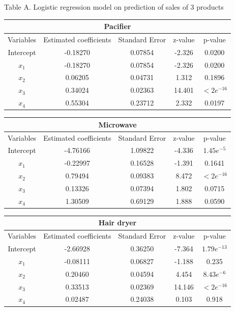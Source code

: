\documentclass[reqno]{article}
\theoremstyle{definition}
\theoremstyle{definition}
\theoremstyle{remark}
\begin{document}
\begin{center}
Table A. Logistic regression model on prediction of sales of 3 products
\begin{table}[]
    \centering
    \begin{tabular}{|c|c|c|c|c|}
    \hline
    \multicolumn{5}{|c|}{Pacifier}\\
    \hline
    Variables & Estimated coefficients &  Standard Error & z-value & p-value \\
    \hline
    Intercept  & -0.18270 &   0.07854  &-2.326 &  0.0200 \\
    $x_1$ & -0.18270 &   0.07854  &-2.326  & 0.0200   \\
    $x_2$ & 0.06205  &  0.04731  & 1.312  & 0.1896 \\
    $x_3$ & 0.34024 &   0.02363 & 14.401   & $<2e^{-16}$ \\
    $x_4$ & 0.55304  &  0.23712  & 2.332 & 0.0197 \\
    \hline
    \end{tabular}
    \begin{tabular}{|c|c|c|c|c|}
    \hline
    \multicolumn{5}{|c|}{Microwave}\\
    \hline
    Variables & Estimated coefficients &  Standard Error & z-value & p-value \\
    \hline
    Intercept  &  -4.76166  &  1.09822 & -4.336& $1.45e^{-5}$ \\
    $x_1$ & -0.22997   & 0.16528  &-1.391  & 0.1641\\
    $x_2$ & 0.79494  &  0.09383  & 8.472 & $<2e^{-16}$ \\
    $x_3$ &0.13326  &  0.07394  & 1.802  & 0.0715 \\
    $x_4$ &1.30509  &  0.69129 &  1.888 &  0.0590 \\
    \hline
    \end{tabular}
    \begin{tabular}{|c|c|c|c|c|}
    \hline
    \multicolumn{5}{|c|}{Hair dryer}\\
    \hline
    Variables & Estimated coefficients &  Standard Error & z-value & p-value \\
    \hline
    Intercept  & -2.66928 &   0.36250 & -7.364& $1.79e^{-13}$ \\
    $x_1$ & -0.08111 &   0.06827&  -1.188   & 0.235\\
    $x_2$ & 0.20460  &  0.04594  & 4.454 &$8.43e^{-6}$\\
    $x_3$ & 0.33513   & 0.02369 & 14.146 & $< 2e^{-16}$ \\
    $x_4$ & 0.02487  &  0.24038  & 0.103 &   0.918     \\
    \hline
    \end{tabular}
\end{table}
\end{center}
\end{document}
